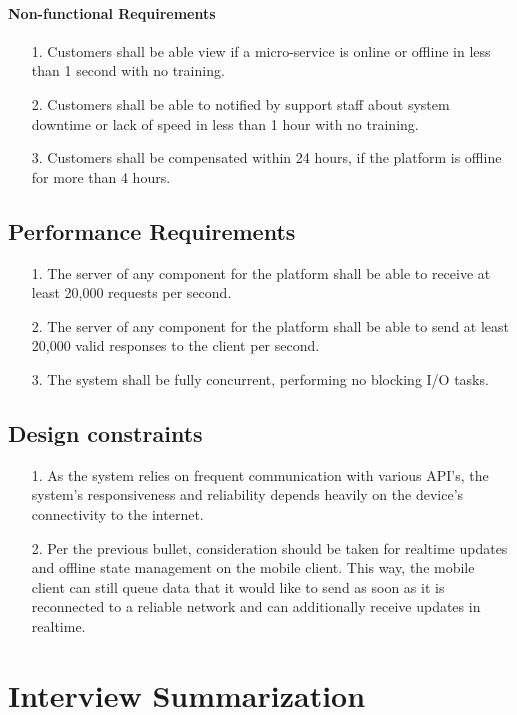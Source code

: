 \documentclass{scrreprt}
\begin{document}
\subsubsection{Non-functional Requirements}
\begin{enumerate}
	\item[1.] Customers shall be able view if a micro-service is online or offline in less than 1 second with no training.
	\item[2.] Customers shall be able to notified by support staff about system downtime or lack of speed in less than 1 hour with no training.
	\item[3.] Customers shall be compensated within 24 hours, if the platform is offline for more than 4 hours.
\end{enumerate}


\section{Performance Requirements}
\begin{enumerate}
	\item[1.] The server of any component for the platform shall be able to receive at least 20,000 requests per second.
	\item[2.] The server of any component for the platform shall be able to send at least 20,000 valid responses to the client per second.
	\item[3.] The system shall be fully concurrent, performing no blocking I/O tasks.
\end{enumerate}


\section{Design constraints}
\begin{enumerate}
	\item[1.] As the system relies on frequent communication with various API's, the system's responsiveness and reliability depends heavily on the device's connectivity to the internet.
	\item[2.] Per the previous bullet, consideration should be taken for realtime updates and offline state management on the mobile client. This way, the mobile client can still queue data that it would like to send as soon as it is reconnected to a reliable network and can additionally receive updates in realtime.
\end{enumerate}

\chapter{Interview Summarization}
\end{document}
